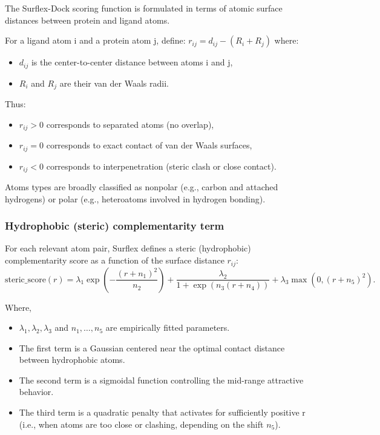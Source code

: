 \documentclass[12pt, a4paper]{article}
\begin{document}
The Surflex-Dock scoring function is formulated in terms of atomic surface distances between protein and ligand atoms.\cite{CH7_Jain2007Surflex21}

For a ligand atom i and a protein atom j, define: $r_{ij} = d_{ij} - (R_i + R_j)$
where:
\begin{itemize}
  \item $d_{ij}$ is the center-to-center distance between atoms i and j,
  \item $R_i$ and $R_j$ are their van der Waals radii.
\end{itemize}

Thus:
\begin{itemize}
  \item $r_{ij} > 0$ corresponds to separated atoms (no overlap),
  \item $r_{ij} = 0$ corresponds to exact contact of van der Waals surfaces,
  \item $r_{ij} < 0$ corresponds to interpenetration (steric clash or close contact).
\end{itemize}

Atoms types are broadly classified as nonpolar (e.g., carbon and attached hydrogens) or polar (e.g., heteroatoms involved in hydrogen bonding).

\subsubsection{Hydrophobic (steric) complementarity term}

For each relevant atom pair, Surflex defines a steric (hydrophobic) complementarity score\cite{CH7_Jain2007Surflex21} as a function of the surface distance $r_{ij}$:
\begin{equation}
  \text{steric\_score}(r)
  =
  \lambda_{1} \exp\!\left(
    -\frac{\left(r + n_{1}\right)^{2}}{n_{2}}
  \right)
  +
  \frac{\lambda_{2}}{
    1 + \exp\!\left(
      n_{3} \left( r + n_{4} \right)
    \right)
  }
  +
  \lambda_{3} \max\!\left( 0,\left( r + n_{5} \right)^{2} \right).
  \label{eq:steric}
\end{equation}

Where,
\begin{itemize}
  \item $\lambda_{1}, \lambda_{2}, \lambda_{3}$ and $n_{1}, \dots, n_{5}$ are empirically fitted parameters.
  \item The first term is a Gaussian centered near the optimal contact distance between hydrophobic atoms.
  \item The second term is a sigmoidal function controlling the mid-range attractive behavior.
  \item The third term is a quadratic penalty that activates for sufficiently positive r (i.e., when atoms are too close or clashing, depending on the shift $n_5$).
\end{itemize}
\end{document}
